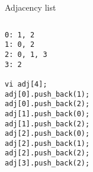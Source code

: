 \documentclass[12pt,t]{beamer}
\begin{document}
\begin{frame}[fragile]{Adjacency list}

    \begin{columns}[T]
        \begin{column}{.4\textwidth}
            \begin{verbatim}
0: 1, 2
1: 0, 2
2: 0, 1, 3
3: 2

vi adj[4];
adj[0].push_back(1);
adj[0].push_back(2);
adj[1].push_back(0);
adj[1].push_back(2);
adj[2].push_back(0);
adj[2].push_back(1);
adj[2].push_back(2);
adj[3].push_back(2);
            \end{verbatim}
        \end{column}%
        \hfill%
        \begin{column}{.4\textwidth}
            \begin{figure}
            \end{figure}
        \end{column}%
    \end{columns}
\end{frame}
\end{document}
